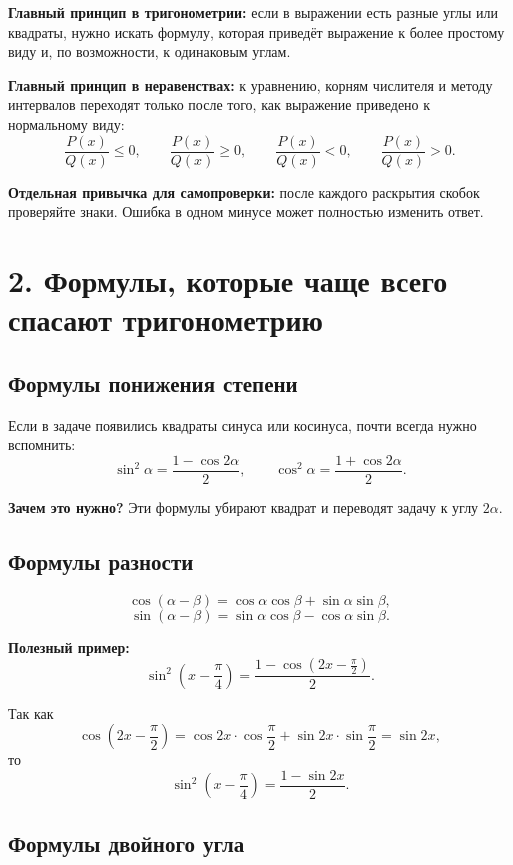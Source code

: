 \documentclass[a4paper,12pt]{article}
\newcommand{\important}[1]{\textcolor{darkaccent}{\textbf{#1}}}
\begin{document}
\important{Главный принцип в тригонометрии:} если в выражении есть разные углы или квадраты, нужно искать формулу, которая приведёт выражение к более простому виду и, по возможности, к одинаковым углам.

\important{Главный принцип в неравенствах:} к уравнению, корням числителя и методу интервалов переходят только после того, как выражение приведено к нормальному виду:
\[
\frac{P(x)}{Q(x)}\le 0,
\qquad
\frac{P(x)}{Q(x)}\ge 0,
\qquad
\frac{P(x)}{Q(x)}<0,
\qquad
\frac{P(x)}{Q(x)}>0.
\]

\important{Отдельная привычка для самопроверки:} после каждого раскрытия скобок проверяйте знаки. Ошибка в одном минусе может полностью изменить ответ.

\section*{2. Формулы, которые чаще всего спасают тригонометрию}

\subsection*{Формулы понижения степени}

Если в задаче появились квадраты синуса или косинуса, почти всегда нужно вспомнить:
\[
\sin^2\alpha=\frac{1-\cos 2\alpha}{2},
\qquad
\cos^2\alpha=\frac{1+\cos 2\alpha}{2}.
\]

\important{Зачем это нужно?} Эти формулы убирают квадрат и переводят задачу к углу $2\alpha$.

\subsection*{Формулы разности}

\[
\cos(\alpha-\beta)=\cos\alpha\cos\beta+\sin\alpha\sin\beta,
\]
\[
\sin(\alpha-\beta)=\sin\alpha\cos\beta-\cos\alpha\sin\beta.
\]

\important{Полезный пример:}
\[
\sin^2\left(x-\frac{\pi}{4}\right)
=
\frac{1-\cos\left(2x-\frac{\pi}{2}\right)}{2}.
\]

Так как
\[
\cos\left(2x-\frac{\pi}{2}\right)
=
\cos 2x\cdot \cos\frac{\pi}{2}
+
\sin 2x\cdot \sin\frac{\pi}{2}
=
\sin 2x,
\]
то
\[
\boxed{
\sin^2\left(x-\frac{\pi}{4}\right)=\frac{1-\sin 2x}{2}.
}
\]

\subsection*{Формулы двойного угла}
\end{document}
